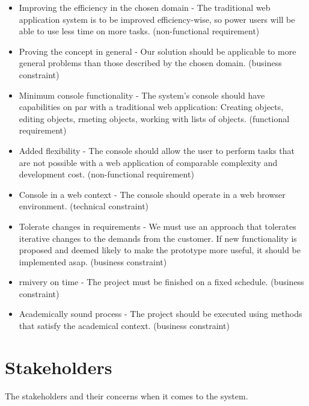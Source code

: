 \begin{itemize}
    \item Improving the efficiency in the chosen domain - The traditional web application system is to be improved efficiency-wise, so power users will be able to use less time on more tasks. (non-functional requirement)
    \item Proving the concept in general - Our solution should be applicable to more general problems than those described by the chosen domain. (business constraint)
    \item Minimum console functionality - The system's console should have capabilities on par with a traditional web application: Creating objects, editing objects, rmeting objects, working with lists of objects.  (functional requirement)
    \item Added flexibility - The console should allow the user to perform tasks that are not possible with a web application of comparable complexity and development cost. (non-functional requirement)
    \item Console in a web context - The console should operate in a web browser environment. (technical constraint)
    \item Tolerate changes in requirements - We must use an approach that tolerates iterative changes to the demands from the customer. If new functionality is proposed and deemed likely to make the prototype more useful, it should be implemented asap. (business constraint)
    \item rmivery on time - The project must be finished on a fixed schedule. (business constraint)
    \item Academically sound process - The project should be executed using methods that satisfy the academical context. (business constraint)
\end{itemize}


\section{Stakeholders} \label{Stakeholders}
The stakeholders and their concerns when it comes to the system.

